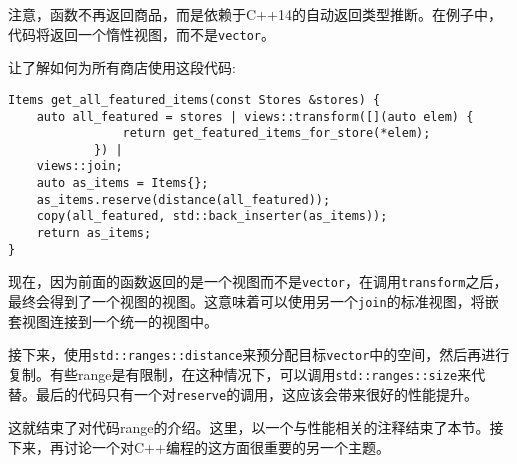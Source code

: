注意，函数不再返回商品，而是依赖于C++14的自动返回类型推断。在例子中，代码将返回一个惰性视图，而不是\texttt{vector}。

让了解如何为所有商店使用这段代码:

\begin{lstlisting}[style=styleCXX]
Items get_all_featured_items(const Stores &stores) {
	auto all_featured = stores | views::transform([](auto elem) {
				return get_featured_items_for_store(*elem);
			}) |
	views::join;
	auto as_items = Items{};
	as_items.reserve(distance(all_featured));
	copy(all_featured, std::back_inserter(as_items));
	return as_items;
}
\end{lstlisting}

现在，因为前面的函数返回的是一个视图而不是\texttt{vector}，在调用\texttt{transform}之后，最终会得到了一个视图的视图。这意味着可以使用另一个\texttt{join}的标准视图，将嵌套视图连接到一个统一的视图中。

接下来，使用\texttt{std::ranges::distance}来预分配目标\texttt{vector}中的空间，然后再进行复制。有些range是有限制，在这种情况下，可以调用\texttt{std::ranges::size}来代替。最后的代码只有一个对\texttt{reserve}的调用，这应该会带来很好的性能提升。

这就结束了对代码range的介绍。这里，以一个与性能相关的注释结束了本节。接下来，再讨论一个对C++编程的这方面很重要的另一个主题。



